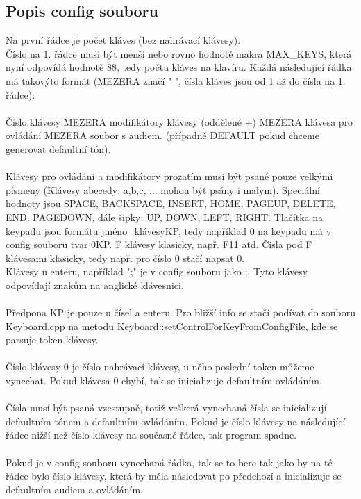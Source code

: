 \documentclass[12pt]{article}
\begin{document}
	\subsection{Popis config souboru}
	Na první řádce je počet kláves (bez nahrávací klávesy).
	\\
	Číslo na 1. řádce musí být menší nebo rovno hodnotě makra MAX\_KEYS, která nyní odpovídá hodnotě 88, tedy počtu kláves na klavíru. 
	Každá následující řádka má takovýto formát (MEZERA značí " ", čísla kláves jsou od 1 až do čísla na 1. řádce):
	\\
	\\
	Číslo klávesy MEZERA modifikátory klávesy (oddělené +) MEZERA klávesa pro ovládání MEZERA soubor s audiem. (případně DEFAULT pokud chceme generovat defaultní tón).
	\\
	\\
	Klávesy pro ovládání a modifikátory prozatím musí být psané pouze velkými písmeny (Klávesy abecedy: a,b,c, ... mohou být psány i malym). Speciální hodnoty jsou SPACE, BACKSPACE, INSERT, HOME, PAGEUP, DELETE, END, PAGEDOWN, dále šipky: UP, DOWN, LEFT, RIGHT. Tlačítka na keypadu jsou formátu jméno\_klávesyKP, tedy například 0 na keypadu má v config souboru tvar 0KP. F klávesy klasicky, např. F11 atd. Čísla pod F klávesami klasicky, tedy např. pro číslo 0 stačí napsat 0.
	\\
	Klávesy u enteru, například ";" je v config souboru jako ;. Tyto klávesy odpovídají znakům na anglické klávesnici. 
	\\
	\\
	Předpona KP je pouze u čísel a enteru. Pro bližší info se stačí podívat do souboru Keyboard.cpp na metodu Keyboard::setControlForKeyFromConfigFile, kde se parsuje token klávesy.	 
	\\
	\\
	Číslo klávesy 0 je číslo nahrávací klávesy, u něho poslední token můžeme vynechat. Pokud klávesa 0 chybí, tak se inicializuje defaultním ovládáním.
	\\
	\\
	Čísla musí být psaná vzestupně, totiž veškerá vynechaná čísla se inicializují defaultním tónem a defaultním ovládáním.
	Pokud je číslo klávesy na následující řádce nižší než číslo klávesy na současné řádce, tak program spadne.
	\\
	\\
	Pokud je v config souboru vynechaná řádka, tak se to bere tak jako by na té řádce bylo číslo klávesy, která by měla následovat po předchozí a inicializuje se defaultním audiem a ovládáním.
\end{document}

